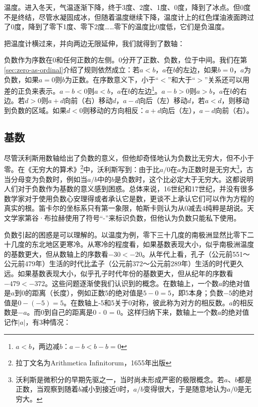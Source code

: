 \documentclass[b5paper]{ctexart}
\begin{document}
\begin{example}
温度。进入冬天，气温逐渐下降，终于3度、2度、1度、0度，降到了冰点。但0度不是终结，尽管水凝固成冰，但随着温度继续下降，温度计上的红色煤油液面跨过了0度，降到了零下1度、零下2度……零下的温度比0度低，它们是负温度。
\end{example}

把温度计横过来，并向两边无限延伸，我们就得到了数轴：

\begin{center}
\end{center}

负数作为序数在0和任何正数的左侧。0分开了正数、负数，位于中间。我们在第\ref{sec:zero-as-ordinal}介绍了规则依然成立：若$a < b$，$a$在$b$的左边，如果$b = 0$，$a$为负数，如果$a = 0$则$b$为正数。在序数意义下，小于“$<$”和大于“$>$”关系还可以用差的正负来表示。$a - b < 0$则$a < b$，$a$在$b$的左边\footnote{$a < b$，两边减$b$：$a - b < b - b = 0$}。$a - b > 0$则$a > b$，$a$在$b$的右边。若$d > 0$则$a + d$向前（右）移动$d$，$a - d$向后（左）移动$d$，若$a < d$，则移动到负数的区域。如果$d < 0$则移动的方向相反：$a + d$向后（左），$a - d$向前（右）。

\subsection{基数}
尽管沃利斯用数轴给出了负数的意义，但他却奇怪地认为负数比无穷大，但不小于零。在《无穷大的算术》\footnote{拉丁文名为Arithmetica Infinitorum，1655年出版}中，沃利斯写到：由于比$a/0$在$a$为正数时是无穷大\footnote{沃利斯是微积分的早期先驱之一，当时尚未形成严密的极限概念。若$a$、$b$都是正数，当观察到随着$b$减小到接近0时，$a/b$变得很大，于是随意地认为$a/0$是无穷大。}，古当分母变为负数时，例如当$a/b$中的$b$是负数时，这个比必定大于无穷大\cite{MKlein-1972}。这都说明人们对于负数作为基数的意义感到困惑。总体来说，16世纪和17世纪，并没有很多数学家对于使用负数心安理得或者承认它是数，更谈不上承认它们可以作为方程的真实的根\cite{MKlein-1972}。笛卡尔的坐标系只有第一象限，帕斯卡则认为从0减去4纯粹是胡说。天文学家第谷·布拉赫使用了符号“-”来标识负数，但他认为负数只能私下使用。

负数引起的困惑是可以理解的。以温度为例，零下三十几度的南极洲显然比零下二十几度的东北地区更寒冷。从寒冷的程度看，如果基数表现大小，似乎南极洲温度的基数更大，但从数轴上的序数看$-30 < -20$。从年代上看，孔子（公元前551～公元前479年）生活的时代比孟子（公元前372～公元前289年）生活的时代更久远。如果基数表现大小，似乎孔子时代年份的基数更大，但从纪年的序数看$-479 < -372$。这些问题逐渐使我们认识到的概念。在数轴上，一个数$a$的绝对值是$a$到0的距离（长度），例如正数5的绝对值是$5 - 0 = 5$，即5本身；负数$-5$的绝对值是$0 - (-5) = 5$。在数轴上-5和5关于0对称，彼此称为对方的相反数。$a$的相反数是$-a$。而0到自己的距离是0 - 0 = 0。这样归纳下来，数轴上一个数$a$的绝对值记作$|a|$，有3种情况：
\end{document}
